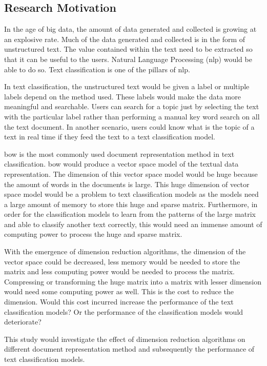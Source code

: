 \subsection{Research Motivation}
In the age of big data, the amount of data generated and collected is growing at an explosive rate. Much of the data generated and collected is in the form of unstructured text. The value contained within the text need to be extracted so that it can be useful to the users. Natural Language Processing (\ac{nlp}) would be able to do so. Text classification is one of the pillars of \ac{nlp}.

In text classification, the unstructured text would be given a label or multiple labels depend on the method used. These labels would make the data more meaningful and searchable. Users can search for a topic just by selecting the text with the particular label rather than performing a manual key word search on all the text document. In another scenario, users could know what is the topic of a text in real time if they feed the text to a text classification model.

\ac{bow} is the most commonly used document representation method in text classification. \Ac{bow} would produce a vector space model of the textual data representation. The dimension of this vector space model would be huge because the amount of words in the documents is large. This huge dimension of vector space model would be a problem to text classification models as the models need a large amount of memory to store this huge and sparse matrix. Furthermore, in order for the classification models to learn from the patterns of the large matrix and able to classify another text correctly, this would need an immense amount of computing power to process the huge and sparse matrix.

With the emergence of dimension reduction algorithms, the dimension of the vector space could be decreased, less memory would be needed to store the matrix and less computing power would be needed to process the matrix. Compressing or transforming the huge matrix into a matrix with lesser dimension would need some computing power as well. This is the cost to reduce the dimension. Would this cost incurred increase the performance of the text classification models? Or the performance of the classification models would deteriorate?

This study would investigate the effect of dimension reduction algorithms on different document representation method and subsequently the performance of text classification models.\\

